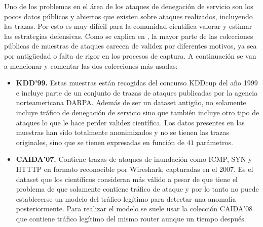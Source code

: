 Uno de los problemas en el área de los ataques de denegación de servicio son los pocos datos públicos y abiertos que existen sobre ataques realizados, incluyendo las trazas. Por esto es muy difícil para la comunidad científica valorar y estimar las estrategias defensivas. Como se explica en \cite{bhatia}, la mayor parte de las colecciones públicas de muestras de ataques carecen de validez por diferentes motivos, ya sea por antig\"uedad o falta de rigor en los procesos de captura. A continuación se van a mencionar y comentar las dos colecciones más usadas:
\begin{itemize}
\item \textbf{KDD'99.} Estas muestras están recogidas del concurso KDDcup del a\~no 1999 e incluye parte de un conjunto de trazas de ataques publicadas por la agencia norteamericana DARPA. Además de ser un dataset antig\"uo, no solamente incluye tráfico de denegación de servicio sino que también incluye otro tipo de ataques lo que le hace perder validez científica. Los datos presentes en las muestras han sido totalmente anonimizados y no se tienen las trazas originales, sino que se tienen expresadas en función de $41$ parámetros.
\item \textbf{CAIDA'07.} Contiene trazas de ataques de inundación como ICMP, SYN y HTTTP en formato reconocible por Wireshark, capturadas en el 2007\cite{caida}. Es el dataset que los científicos consideran más válido a pesar de que tiene el problema de que solamente contiene tráfico de ataque y por lo tanto no puede establecerse un modelo del tráfico legítimo para detectar una anomalía posteriormente. Para realizar el modelo se suele usar la colección CAIDA'08\cite{caida2} que contiene tráfico legítimo del mismo router aunque un tiempo después. 
\end{itemize}

